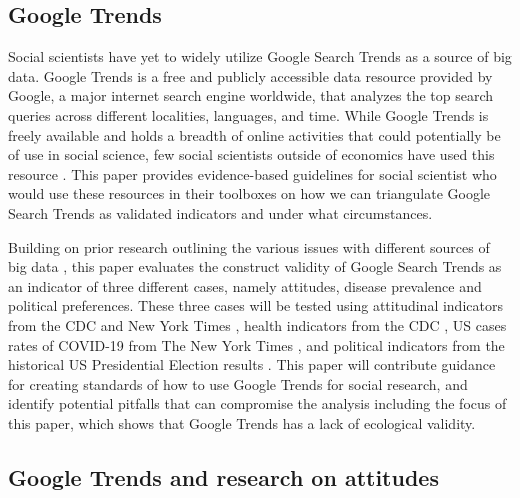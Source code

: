 \subsection{Google Trends}

Social scientists have yet to widely utilize Google Search Trends as a source of
big data. Google Trends is a free and publicly accessible data resource provided
by Google, a major internet search engine worldwide, that analyzes the top
search queries across different localities, languages, and time. While Google
Trends is freely available and holds a breadth of online activities that could
potentially be of use in social science, few social scientists outside of
economics have used this resource \citep[see][for examples]{choi2012predicting,
jun2018ten,da2011search}. This paper provides evidence-based guidelines for
social scientist who would use these resources in their toolboxes on how we can
triangulate Google Search Trends as validated indicators and under what
circumstances.

Building on prior research outlining the various issues with different sources
of big data \citep{boydCriticalQuestionsBig2012,lazerIssuesConstructValidity2015}, this
paper evaluates the construct validity of Google Search Trends as an indicator
of three different cases, namely attitudes, disease prevalence and political
preferences. These three cases will be tested using attitudinal indicators from
the CDC \citeyearpar{vaches_data} and New York Times \citeyearpar{mask_data}, 
health indicators from the CDC
\citeyearpar{suic_data}, US cases rates of COVID-19 from The New York Times
\citeyearpar{covid_data}, and political indicators from the historical US
Presidential Election results \citeyearpar{pres_data}. 
This paper will contribute
guidance for creating standards of how to use Google Trends for social research,
and identify potential pitfalls that can compromise the analysis including the
focus of this paper, which shows that Google Trends has a lack of ecological
validity.


\subsection{Google Trends and research on attitudes}

